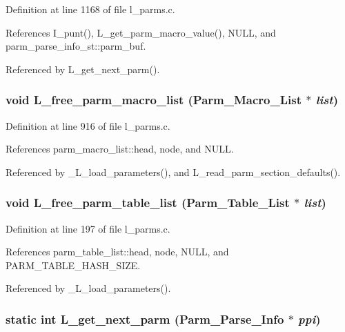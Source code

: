 Definition at line 1168 of file l\_\-parms.c.

References I\_\-punt(), L\_\-get\_\-parm\_\-macro\_\-value(), NULL, and parm\_\-parse\_\-info\_\-st::parm\_\-buf.

Referenced by L\_\-get\_\-next\_\-parm().
\subsubsection{\setlength{\rightskip}{0pt plus 5cm}void L\_\-free\_\-parm\_\-macro\_\-list (\bf{Parm\_\-Macro\_\-List} $\ast$ {\em list})}\label{l__parms_8c_d4b06aa55eb13d77d7d2884ae752aef8}




Definition at line 916 of file l\_\-parms.c.

References parm\_\-macro\_\-list::head, node, and NULL.

Referenced by \_\-L\_\-load\_\-parameters(), and L\_\-read\_\-parm\_\-section\_\-defaults().
\subsubsection{\setlength{\rightskip}{0pt plus 5cm}void L\_\-free\_\-parm\_\-table\_\-list (\bf{Parm\_\-Table\_\-List} $\ast$ {\em list})}\label{l__parms_8c_eff2896ccf418f5e001f57d42e928740}




Definition at line 197 of file l\_\-parms.c.

References parm\_\-table\_\-list::head, node, NULL, and PARM\_\-TABLE\_\-HASH\_\-SIZE.

Referenced by \_\-L\_\-load\_\-parameters().
\subsubsection{\setlength{\rightskip}{0pt plus 5cm}static int L\_\-get\_\-next\_\-parm (\bf{Parm\_\-Parse\_\-Info} $\ast$ {\em ppi})\hspace{0.3cm}{\tt  [static]}}\label{l__parms_8c_c08a9d9f28e265fdc4c89644b5dd64c7}




